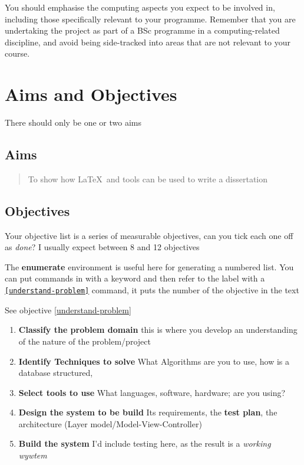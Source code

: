You should emphasise the computing aspects you expect to be involved in, including those specifically relevant to your programme.  Remember that you are undertaking the project as part of a BSc programme in a computing-related discipline, and avoid being side-tracked into areas that are not relevant to your course.

\section{Aims and Objectives}
There should only be one or two aims
\subsection{Aims}
\begin{quote}
	To show how \LaTeX\ and tools can be used to write a dissertation
\end{quote}

\subsection{Objectives}
Your objective list is a series of measurable objectives, can you tick each one off as \emph{done}?  I usually expect between 8 and 12 objectives

The \textbf{enumerate} environment is useful here for generating a numbered list.   You can put \texttt{\label{}} commands in with a keyword \texttt{\label{understand-problem}} and then refer to the label with a \texttt{\ref{understand-problem}} command, it puts the number of the objective in the text
\begin{tcblisting}{ }
	See objective \ref{understand-problem}
\end{tcblisting}
\begin{enumerate}
	\item \textbf{Classify the problem domain}\label{understand-problem}  this is where you develop an understanding of the nature of the problem/project
	\item \textbf{Identify Techniques to solve}  What Algorithms are you to use, how is a database structured,
	\item \textbf{Select tools to use}  What languages, software, hardware; are you using?
	\item \textbf{Design the system to be build}\label{write-code}  Its requirements, the \textbf{test plan}, the architecture (Layer model/Model-View-Controller)
	\item \textbf{Build the system}  I'd include testing here, as the result is a \emph{working wywtem}
\end{enumerate}

